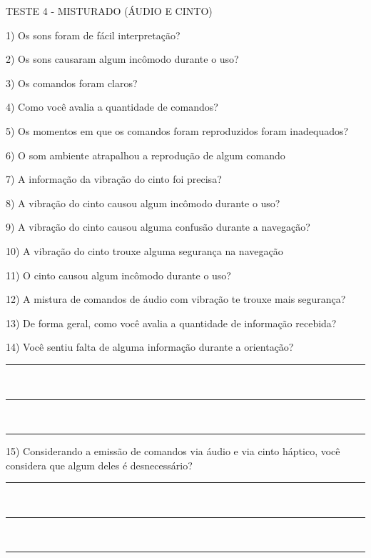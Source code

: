 \vspace{2cm}

{\large TESTE 4 - MISTURADO (ÁUDIO E CINTO)}

1)	Os sons foram de fácil interpretação?



2)	Os sons causaram algum incômodo durante o uso?



3)	Os comandos foram claros?



4)	Como você avalia a quantidade de comandos?



5)	Os momentos em que os comandos foram reproduzidos foram inadequados?



6)	O som ambiente atrapalhou a reprodução de algum comando



7)	A informação da vibração do cinto foi precisa?



8)	A vibração do cinto causou algum incômodo durante o uso?



9)	A vibração do cinto causou alguma confusão durante a navegação?



10)	A vibração do cinto trouxe alguma segurança na navegação



11)	O cinto causou algum incômodo durante o uso?



12)	A mistura de comandos de áudio com vibração te trouxe mais segurança?



13)	De forma geral, como você avalia a quantidade de informação recebida?



14)	Você sentiu falta de alguma informação durante a orientação?

\noindent
\rule{6in}{.2mm} \\
\rule{6in}{.2mm} \\
\rule{6in}{.2mm}


15)	Considerando a emissão de comandos via áudio e via cinto háptico, você considera que algum deles é desnecessário?

\noindent
\rule{6in}{.2mm} \\
\rule{6in}{.2mm} \\
\rule{6in}{.2mm}


